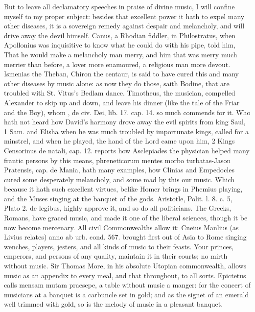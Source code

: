 {But to leave all declamatory speeches in praise of divine music,
I will confine myself to my proper subject: besides that excellent
power it hath to expel many other diseases, it is a sovereign remedy
against  despair and melancholy, and will drive away the devil
himself. Canus, a Rhodian fiddler, in Philostratus, when
Apollonius was inquisitive to know what he could do with his pipe, told
him, That he would make a melancholy man merry, and him that was merry
much merrier than before, a lover more enamoured, a religious man more
devout. Ismenias the Theban, Chiron the centaur, is said to have
cured this and many other diseases by music alone: as now they do
those, saith Bodine, that are troubled with St. Vitus's Bedlam
dance. Timotheus, the musician, compelled Alexander to skip up
and down, and leave his dinner (like the tale of the Friar and the
Boy), whom \Austin{}, de civ. Dei, lib. 17. cap. 14. so much commends for
it. Who hath not heard how David's harmony drove away the evil spirits
from king Saul, 1 Sam.  and Elisha when he was much troubled by
importunate kings, called for a minstrel, and when he played, the hand
of the Lord came upon him, 2 Kings  Censorinus de natali, cap. 12.
reports how Asclepiades the physician helped many frantic persons by
this means, phreneticorum mentes morbo turbatas-Jason Pratensis, cap.
de Mania, hath many examples, how Clinias and Empedocles cured some
desperately melancholy, and some mad by this our music. Which because
it hath such excellent virtues, belike Homer brings in Phemius
playing, and the Muses singing at the banquet of the gods. Aristotle,
Polit. l. 8. c. 5, Plato 2. de legibus, highly approve it, and so do
all politicians. The Greeks, Romans, have graced music, and made it one
of the liberal sciences, though it be now become mercenary. All civil
Commonwealths allow it: Cneius Manlius (as Livius relates) anno
ab urb. cond. 567. brought first out of Asia to Rome singing wenches,
players, jesters, and all kinds of music to their feasts. Your princes,
emperors, and persons of any quality, maintain it in their courts; no
mirth without music. Sir Thomas More, in his absolute Utopian
commonwealth, allows music as an appendix to every meal, and that
throughout, to all sorts. Epictetus calls mensam mutam praesepe, a
table without music a manger: for the concert of musicians at a banquet
is a carbuncle set in gold; and as the signet of an emerald well
trimmed with gold, so is the melody of music in a pleasant banquet.

}
